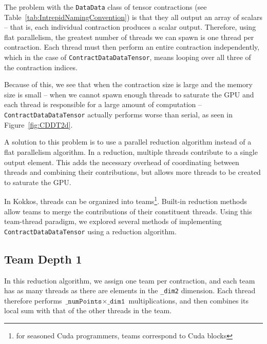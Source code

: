The problem with the \texttt{DataData} class of tensor contractions (see
Table~\ref{tab:IntrepidNamingConvention}) is that they all output an array of
scalars -- that is, each individual contraction produces a scalar output.
Therefore, using flat parallelism, the greatest number of threads we can spawn
is one thread per contraction.  Each thread must then perform an entire
contraction independently, which in the case of
\texttt{ContractDataDataTensor}, means looping over all three of the
contraction indices.

Because of this, we see that when the contraction size is large and the memory
size is small -- when we cannot spawn enough threads to saturate the GPU and
each thread is responsible for a large amount of computation --
\texttt{ContractDataDataTensor} actually performs worse than serial, as seen in
Figure~\ref{fig:CDDT2d}.

A solution to this problem is to use a parallel reduction algorithm instead of
a flat parallelism algorithm.  In a reduction, multiple threads contribute to a
single output element.  This adds the necessary overhead of coordinating between
threads and combining their contributions, but allows more threads to be created
to saturate the GPU.

In Kokkos, threads can be organized into teams\footnote{for seasoned Cuda
programmers, teams correspond to Cuda blocks}.  Built-in reduction methods allow
teams to merge the contributions of their constituent threads.
Using this team-thread paradigm, we explored several methods of implementing
\texttt{ContractDataDataTensor} using a reduction algorithm.

\subsection{Team Depth 1}
    In this reduction algorithm, we assign one team per contraction, and each
    team has as many threads as there are elements in the \texttt{\_dim2}
    dimension.  Each thread therefore performs 
    $\texttt{\_numPoints} \times \texttt{\_dim1}$ multiplications, and then
    combines its local sum with that
    of the other threads in the team.


